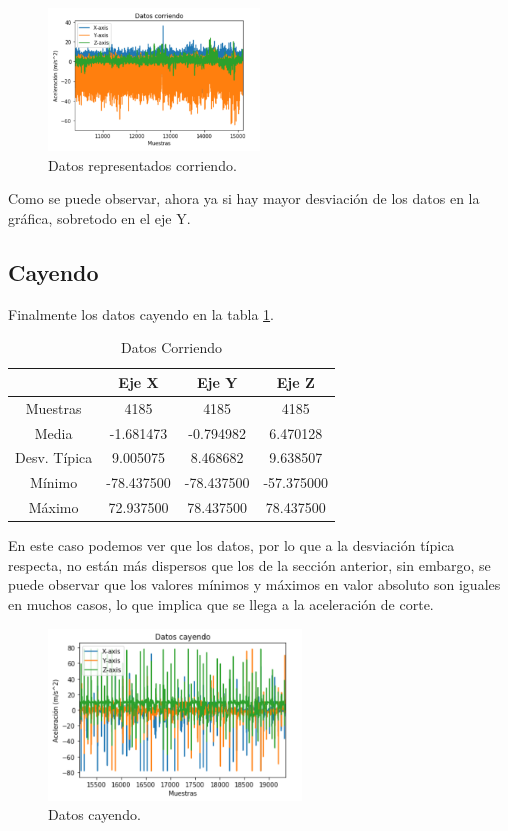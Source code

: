 \documentclass[12pt]{book}
\numberwithin{equation}{section}
\begin{document}
\begin{figure}[h]
    \centering
    \includegraphics[width=0.5\textwidth]{corriendodatos.png}
    \caption{Datos representados corriendo.}
    \label{fig:corriendodatos}
\end{figure}

Como se puede observar, ahora ya si hay mayor desviación de los datos en la gráfica, sobretodo en el eje Y.

\subsection{Cayendo}

Finalmente los datos cayendo en la tabla \ref{tabla6}.

\begin{table}
\centering
\caption{Datos Corriendo}
\begin{tabular}{| c | c | c | c |}
\hline
 & Eje X & Eje Y & Eje Z \\
\hline
Muestras & 4185 & 4185 & 4185 \\
\hline
Media & -1.681473 & -0.794982 & 6.470128 \\
\hline
Desv. Típica & 9.005075 & 8.468682 & 9.638507 \\
\hline
Mínimo & -78.437500 & -78.437500 & -57.375000 \\
\hline
Máximo & 72.937500 & 78.437500 & 78.437500 \\
\hline
\end{tabular}
\label{tabla6}
\end{table}

En este caso podemos ver que los datos, por lo que a la desviación típica respecta, no están más dispersos que los de la sección anterior, sin embargo, se puede observar que los valores mínimos y máximos en valor absoluto son iguales en muchos casos, lo que implica que se llega a la aceleración de corte.

\begin{figure}[h]
    \centering
    \includegraphics[width=0.6\textwidth]{cayendodatos.png}
    \caption{Datos cayendo.}
    \label{fig:cayendodatos}
\end{figure}
\end{document}
